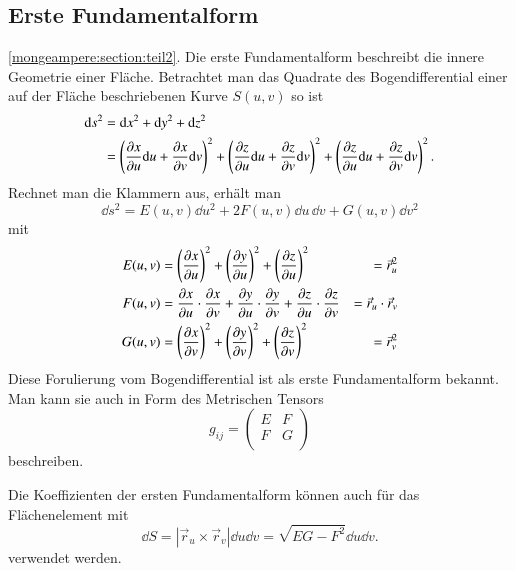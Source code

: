 \subsection{Erste Fundamentalform
\label{mongeampere:subsection:finibus}}
\ref{mongeampere:section:teil2}.
Die erste Fundamentalform beschreibt die innere Geometrie einer Fläche.
Betrachtet man das Quadrate des Bogendifferential einer auf der Fläche 
beschriebenen Kurve $S(u,v)$ so ist 
\begin{equation}
  \begin{split}
    \dd s^2 &= \dd x^2 + \dd y^2 + \dd z^2 \\
          &= \left(\pdv{x}{u}\dd u + \pdv{x}{v}\dd v  \right)^2
          + \left(\pdv{z}{u}\dd u + \pdv{z}{v}\dd v  \right)^2
          + \left(\pdv{z}{u}\dd u + \pdv{z}{v}\dd v  \right)^2.
  \end{split}
  \label{mongeampere:bogdiff}
\end{equation}
Rechnet man die Klammern aus, erhält man 
\begin{equation}
    \dd s^2 = E(u,v) \dd u^2 + 2F(u,v) \dd u \, \dd v + G(u,v)\dd v^2
    \label{mongeampere:1fundform}
\end{equation}
mit
\begin{align}
     E(u,v) &= \left(\pdv{x}{u} \right)^2 +
     \left(\pdv{y}{u} \right)^2 +
     \left(\pdv{z}{u} \right)^2 
            &= \vec r_u^2\\
     F(u,v) &= 
     \pdv{x}{u} \cdot \pdv{x}{v} +
     \pdv{y}{u} \cdot \pdv{y}{v} +
     \pdv{z}{u} \cdot \pdv{z}{v}
            &= \vec r_u \cdot \vec r_v \\
      G(u,v) &= \left(\pdv{x}{v} \right)^2 +
     \left(\pdv{y}{v} \right)^2 +
     \left(\pdv{z}{v} \right)^2 
             &= \vec r_v ^2\\
  \label{mongeampere:1fundbed}
\end{align}
Diese Forulierung vom Bogendifferential ist als erste Fundamentalform bekannt.
Man kann sie auch in Form des Metrischen Tensors 
\begin{equation}
  g_{ij} = \begin{pmatrix}
    E & F \\
    F & G \\
  \end{pmatrix}
  \label{mongeampere:erstmettens}
\end{equation}
beschreiben.

Die Koeffizienten der ersten Fundamentalform können auch für das Flächenelement mit
\begin{equation}
  \dd S = |\vec r_u \times \vec r_v|\dd u \dd v = \sqrt{EG-F^2} \dd u \dd v.
  \label{mongeampere:ds}
\end{equation}
verwendet werden.

